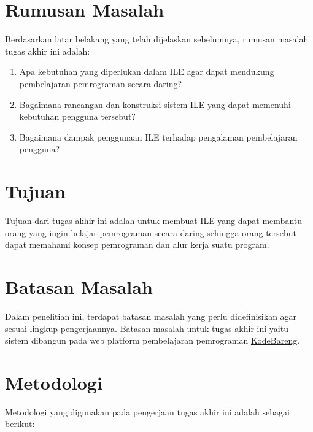 
\section{Rumusan Masalah}
Berdasarkan latar belakang yang telah dijelaskan sebelumnya, rumusan masalah tugas akhir ini adalah:

\begin{enumerate}
      \item Apa kebutuhan yang diperlukan dalam ILE agar dapat mendukung pembelajaran pemrograman secara daring?
      \item Bagaimana rancangan dan konstruksi sistem ILE yang dapat memenuhi kebutuhan pengguna tersebut?
      \item Bagaimana dampak penggunaan ILE terhadap pengalaman pembelajaran pengguna?
\end{enumerate}

\section{Tujuan}
Tujuan dari tugas akhir ini adalah untuk membuat ILE yang dapat membantu orang yang ingin belajar pemrograman secara daring sehingga orang tersebut dapat memahami konsep pemrograman dan alur kerja suatu program.

\section{Batasan Masalah}
Dalam penelitian ini, terdapat batasan masalah yang perlu didefinisikan agar sesuai lingkup pengerjaannya. Batasan masalah untuk tugas akhir ini yaitu sistem dibangun pada web platform pembelajaran pemrograman \href{https://kodebareng.id}{KodeBareng}.

\section{Metodologi}
Metodologi yang digunakan pada pengerjaan tugas akhir ini adalah sebagai berikut:

